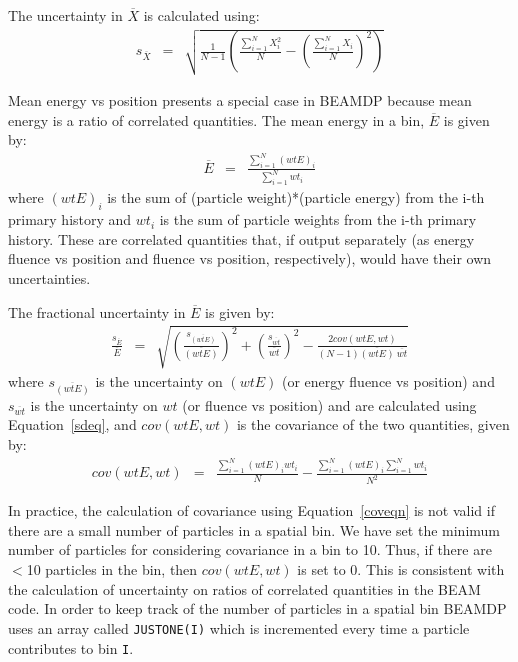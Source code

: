 \documentclass[12pt,twoside]{article}
\begin{document}
The uncertainty in $\overline{X}$ is calculated using:
\begin{eqnarray}
s_{\overline{X}}& =& \sqrt{\frac{1}{N-1}\left(\frac{\sum_{i=1}^{N}X_i^2}
          {N}-\left(\frac{\sum_{i=1}^{N}X_i}{N}\right)^2\right)}
\label{sdeq}
\end{eqnarray}

Mean energy vs position presents a special case in BEAMDP
because mean energy is a ratio of correlated quantities.  The mean
energy in a bin, $\overline{E}$ is given by:
\begin{eqnarray}
\overline{E}& =&  \frac{\sum_{i=1}^{N}\left(wtE\right)_i}{\sum_{i=1}^{N}wt_i}
\end{eqnarray}
where $\left(wtE\right)_i$ is the sum of (particle weight)*(particle energy)
from the i-th primary history and $wt_i$ is the sum of particle weights from
the i-th primary history.  These are correlated
quantities that, if
output separately (as energy fluence vs position and fluence vs position,
respectively), would have their own uncertainties.

The fractional uncertainty in $\overline{E}$ is given by:
\begin{eqnarray}
\frac{s_{\overline{E}}}{\overline{E}}& =& \sqrt{\left({\frac{s_{\overline{
\left(wtE\right)}}}
{\overline{\left(wtE\right)}}}\right)^2 + \left({\frac{s_{\overline{wt}}}{\overline{wt}}}
\right)^2 -
\frac{2cov\left(wtE,wt\right)}{\left(N-1\right)
\overline{\left(wtE\right)}~\overline{wt}}}
\label{sdcoveqn}
\end{eqnarray}
where $s_{\overline{\left(wtE\right)}}$ is the uncertainty on
$\left(wtE\right)$ (or energy fluence vs position) and
$s_{\overline{wt}}$ is the uncertainty on $wt$ (or fluence vs position) and
are calculated using Equation~\ref{sdeq}, and $cov\left(wtE,wt\right)$
is the covariance of the two quantities, given by:
\begin{eqnarray}
cov\left(wtE,wt\right)& =&\frac{\sum_{i=1}^{N}
\left(wtE\right)_iwt_i}{N}-
\frac{\sum_{i=1}^{N}\left(wtE\right)_i\sum_{i=1}^{N}wt_i}{N^2}
\label{coveqn}
\end{eqnarray}

In practice, the calculation of covariance using Equation~\ref{coveqn} is
not valid if there are a small number of particles in a spatial bin.
We have set the minimum number of particles for considering covariance
in a bin to 10.  Thus, if there are $<$10 particles in the bin, then
$cov\left(wtE,wt\right)$ is set to 0.  This is consistent with the
calculation of uncertainty on ratios of correlated quantities in the BEAM
code.  In order to keep track of the number of particles in a spatial bin
BEAMDP uses an array called {\tt JUSTONE(I)} which is incremented every
time a particle contributes to bin {\tt I}.
\end{document}
